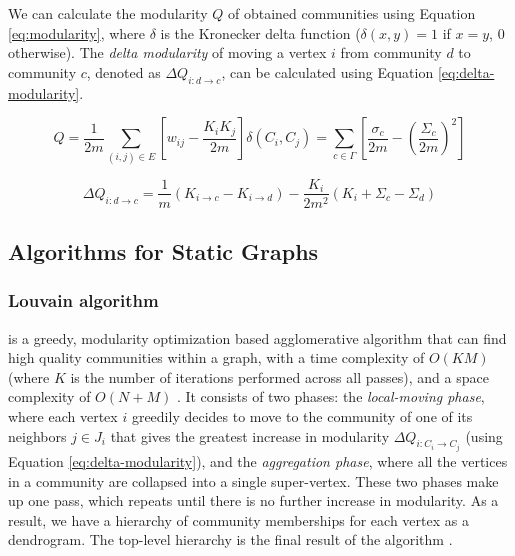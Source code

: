 We can calculate the modularity $Q$ of obtained communities using Equation \ref{eq:modularity}, where $\delta$ is the Kronecker delta function ($\delta (x,y)=1$ if $x=y$, $0$ otherwise). The \textit{delta modularity} of moving a vertex $i$ from community $d$ to community $c$, denoted as $\Delta Q_{i: d \rightarrow c}$, can be calculated using Equation \ref{eq:delta-modularity}.

\begin{equation}
\label{eq:modularity}
  Q
  = \frac{1}{2m} \sum_{(i, j) \in E} \left[w_{ij} - \frac{K_i K_j}{2m}\right] \delta(C_i, C_j)
  = \sum_{c \in \Gamma} \left[\frac{\sigma_c}{2m} - \left(\frac{\Sigma_c}{2m}\right)^2\right]
\end{equation}

\begin{equation}
\label{eq:delta-modularity}
  \Delta Q_{i: d \rightarrow c}
  = \frac{1}{m} (K_{i \rightarrow c} - K_{i \rightarrow d}) - \frac{K_i}{2m^2} (K_i + \Sigma_c - \Sigma_d)
\end{equation}




\subsection{Algorithms for Static Graphs}

\subsubsection{Louvain algorithm \cite{com-blondel08}}
\label{sec:about-louvain}

\Lou{} is a greedy, modularity optimization based agglomerative algorithm that can find high quality communities within a graph, with a time complexity of $O (KM)$ (where $K$ is the number of iterations performed across all passes), and a space complexity of $O(N + M)$ \cite{com-lancichinetti09}. It consists of two phases: the \textit{local-moving phase}, where each vertex $i$ greedily decides to move to the community of one of its neighbors $j \in J_i$ that gives the greatest increase in modularity $\Delta Q_{i:C_i \rightarrow C_j}$ (using Equation \ref{eq:delta-modularity}), and the \textit{aggregation phase}, where all the vertices in a community are collapsed into a single super-vertex. These two phases make up one pass, which repeats until there is no further increase in modularity. As a result, we have a hierarchy of community memberships for each vertex as a dendrogram. The top-level hierarchy is the final result of the algorithm \cite{com-leskovec21}.




